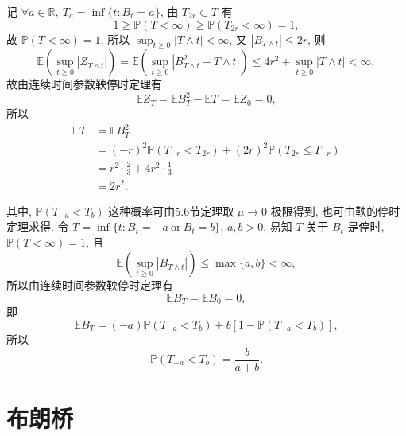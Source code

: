 \documentclass[openany]{ctexbook}
\theoremstyle{kaiti}
\theoremstyle{normal}
\begin{document}
记 $\forall a\in\mathbb{R},~T_a=\inf\{t:B_t=a\}$, 由 $T_{2r}\subset T$ 有
\begin{equation}
  1\geqslant \mathbb{P}(T<\infty)\geqslant \mathbb{P}(T_{2r}<\infty)=1,
\end{equation}
故 $\mathbb{P}(T<\infty)=1$, 所以 $\sup_{t\geqslant0}|T\wedge t|<\infty$, 又 $|B_{T\wedge t}|\leqslant 2r$, 则
\begin{equation}
  \mathbb{E}\left(\sup_{t\geqslant0}|Z_{T\wedge t}|\right)=\mathbb{E}\left(\sup_{t\geqslant0}|B_{T\wedge t}^2-{T\wedge t}|\right)\leqslant 4r^2+\sup_{t\geqslant0}|T\wedge t|<\infty,
\end{equation}
故由连续时间参数鞅停时定理有
\begin{equation}
  \mathbb{E}Z_{T}=\mathbb{E}B_T^2-\mathbb{E}T=\mathbb{E}Z_0=0,
\end{equation}
所以
\begin{equation}
  \begin{aligned}
    \mathbb{E}T&=\mathbb{E}B_T^2\\
    &=(-r)^2\mathbb{P}(T_{-r}<T_{2r})+(2r)^2\mathbb{P}(T_{2r}\leqslant T_{-r})\\
    &=r^2\cdot\frac{2}{3}+4r^2\cdot\frac{1}{3}\\
    &=2r^2.
  \end{aligned}
\end{equation}

其中, $\mathbb{P}(T_{-a}<T_{b})$ 这种概率可由5.6节定理取 $\mu\to0$ 极限得到, 也可由鞅的停时定理求得. 
令 $T=\inf\{t:B_t=-a~\text{or}~B_t=b\}$, $a,b>0$, 易知 $T$ 关于 $B_t$ 是停时, $\mathbb{P}(T<\infty)=1$, 且
\begin{equation}
  \mathbb{E}\left(\sup_{t\geqslant0}|B_{T\wedge t}|\right)\leqslant \max\{a,b\}<\infty,
\end{equation}
所以由连续时间参数鞅停时定理有
\begin{equation}
  \mathbb{E}B_{T}=\mathbb{E}B_0=0,
\end{equation}
即
\begin{equation}
  \mathbb{E}B_T=(-a)\mathbb{P}(T_{-a}<T_b)+b[1-\mathbb{P}(T_{-a}<T_b)],
\end{equation}
所以
\begin{equation}
  \mathbb{P}(T_{-a}<T_b)=\frac{b}{a+b}.
\end{equation}

\section{布朗桥}
\end{document}
